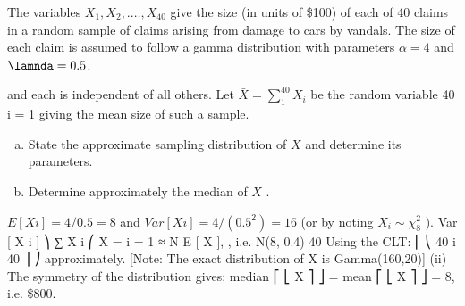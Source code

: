 \documentclass[a4paper,12pt]{article}
\begin{document}
\item The variables $X_1 , X_2 , .\ldots, X_{40}$ give the size (in units of \$100) of each of 40 claims in a random sample of claims arising from damage to cars by vandals. The size of each claim is assumed to follow a gamma distribution with parameters $\alpha = 4$ and $\lamnda = 0.5$.

and each is independent of all others. Let $\bar{X} =
\sum^{40}_{1} X_i$ be the random variable
40 i = 1
giving the mean size of such a sample.
\begin{enumerate}[(a)]
\item 
State the approximate sampling distribution of $X$ and determine its parameters.
\item 
Determine approximately the median of $X$ .
\end{enumerate}

\newpage

$E[X i ] = 4/0.5 = 8$ and $Var[X i ] = 4/(0.5^2) = 16$ (or by noting $ X_i \sim \chi^2_{8}$ ).
Var [ X i ] ⎞
∑ X i ⎛
X = i = 1 ≈ N E [ X ],
, i.e. N(8, 0.4)
40
Using the CLT:
⎜
⎝
40
i
40
⎟
⎠
approximately.
[Note: The exact distribution of X is Gamma(160,20)]
(ii)
The symmetry of the distribution gives: median ⎡ ⎣ X ⎤ ⎦ = mean ⎡ ⎣ X ⎤ ⎦ = 8,
i.e. \$800.

\end{document}
